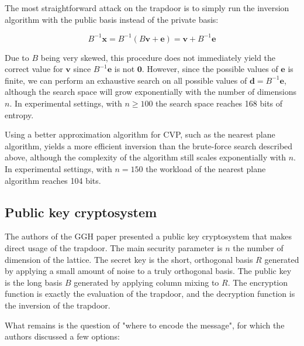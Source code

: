 \documentclass[letterpaper,12pt]{article}
\begin{document}
The most straightforward attack on the trapdoor is to simply run the inversion algorithm with the public basis instead of the private basis:

$$
B^{-1}\mathbf{x} = B^{-1}(B\mathbf{v} + \mathbf{e}) = \mathbf{v} + B^{-1}\mathbf{e}
$$

Due to $B$ being very skewed, this procedure does not immediately yield the correct value for $\mathbf{v}$ since $B^{-1}\mathbf{e}$  is not $\mathbf{0}$. However, since the possible values of $\mathbf{e}$ is finite, we can perform an exhaustive search on all possible values of $\mathbf{d} = B^{-1}\mathbf{e}$, although the search space will grow exponentially with the number of dimensions $n$. In experimental settings, with $n \geq 100$ the search space reaches 168 bits of entropy.

Using a better approximation algorithm for CVP, such as the nearest plane algorithm, yields a more efficient inversion than the brute-force search described above, although the complexity of the algorithm still scales exponentially with $n$. In experimental settings, with $n=150$ the workload of the nearest plane algorithm reaches 104 bits.

\subsection{Public key cryptosystem}
The authors of the GGH paper presented a public key cryptosystem that makes direct usage of the trapdoor. The main security parameter is $n$ the number of dimension of the lattice. The secret key is the short, orthogonal basis $R$ generated by applying a small amount of noise to a truly orthogonal basis. The public key is the long basis $B$ generated by applying column mixing to $R$. The encryption function is exactly the evaluation of the trapdoor, and the decryption function is the inversion of the trapdoor.

What remains is the question of "where to encode the message", for which the authors discussed a few options:
\end{document}
